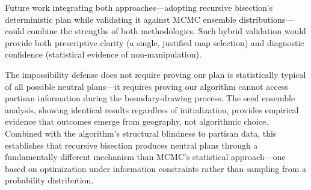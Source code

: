 Future work integrating both approaches—adopting recursive bisection's deterministic plan while validating it against MCMC ensemble distributions—could combine the strengths of both methodologies. Such hybrid validation would provide both prescriptive clarity (a single, justified map selection) and diagnostic confidence (statistical evidence of non-manipulation).

The impossibility defense does not require proving our plan is statistically typical of all possible neutral plans—it requires proving our algorithm cannot access partisan information during the boundary-drawing process. The seed ensemble analysis, showing identical results regardless of initialization, provides empirical evidence that outcomes emerge from geography, not algorithmic choice. Combined with the algorithm's structural blindness to partisan data, this establishes that recursive bisection produces neutral plans through a fundamentally different mechanism than MCMC's statistical approach—one based on optimization under information constraints rather than sampling from a probability distribution.
